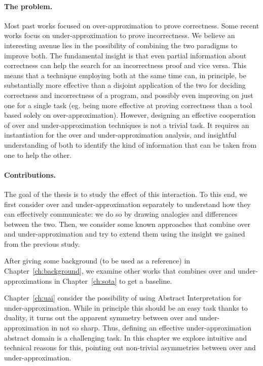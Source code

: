 \paragraph*{The problem.}
Most past works focused on over-approximation to prove correctness. Some recent works focus on under-approximation to prove incorrectness. We believe an interesting avenue lies in the possibility of combining the two paradigms to improve both.
The fundamental insight is that even partial information about correctness can help the search for an incorrectness proof and vice versa. This means that a technique employing both at the same time can, in principle, be substantially more effective than a disjoint application of the two for deciding correctness and incorrectness of a program, and possibly even improving on just one for a single task (eg. being more effective at proving correctness than a tool based solely on over-approximation).
However, designing an effective cooperation of over and under-approximation techniques is not a trivial task. It requires an instantiation for the over and under-approximation analysis, and insightful understanding of both to identify the kind of information that can be taken from one to help the other.

\paragraph*{Contributions.}
The goal of the thesis is to study the effect of this interaction. To this end, we first consider over and under-approximation separately to understand how they can effectively communicate: we do so by drawing analogies and differences between the two. Then, we consider some known approaches that combine over and under-approximation and try to extend them using the insight we gained from the previous study.

After giving some background (to be used as a reference) in Chapter~\ref{ch:background}, we examine other works that combines over and under-approximations in Chapter~\ref{ch:sota} to get a baseline.

Chapter~\ref{ch:uai} consider the possibility of using Abstract Interpretation for under\hyp{}approximation. While in principle this should be an easy task thanks to duality, it turns out the apparent symmetry between over and under-approximation in not so sharp. Thus, defining an effective under-approximation abstract domain is a challenging task. In this chapter we explore intuitive and technical reasons for this, pointing out non-trivial asymmetries between over and under-approximation.

